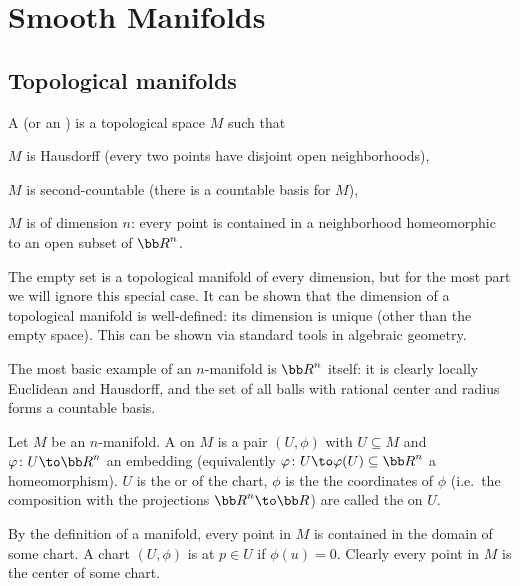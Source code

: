 \section{Smooth Manifolds}

\subsection{Topological manifolds}

\bdefn

    A  (or an ) is a topological space $M$ such that
    \benum
        \item $M$ is Hausdorff (every two points have disjoint open neighborhoods),
        \item $M$ is second-countable (there is a countable basis for $M$),
        \item $M$ is  of dimension $n$: every point is contained in a neighborhood homeomorphic to an open subset of $\bR^n$.
    \eenum

\edefn

The empty set is a topological manifold of every dimension, but for the most part we will ignore this special case.
It can be shown that the dimension of a topological manifold is well-defined: its dimension is unique (other than the empty space).
This can be shown via standard tools in algebraic geometry.

The most basic example of an $n$-manifold is $\bR^n$ itself: it is clearly locally Euclidean and Hausdorff, and the set of all balls with rational center and radius forms
a countable basis.

\bdefn

    Let $M$ be an $n$-manifold.
    A  on $M$ is a pair $(U,\phi)$ with $U\subseteq M$ and $\phi\colon U\to\bR^n$ an embedding (equivalently $\phi\colon U\to\phi(U)\subseteq\bR^n$
    a homeomorphism).
    $U$ is the  or  of the chart, $\phi$ is the  the coordinates of $\phi$
    (i.e.\ the composition with the projections $\bR^n\to\bR$) are called the  on $U$.

    By the definition of a manifold, every point in $M$ is contained in the domain of some chart.
    A chart $(U,\phi)$ is  at $p\in U$ if $\phi(u)=0$.
    Clearly every point in $M$ is the center of some chart.

